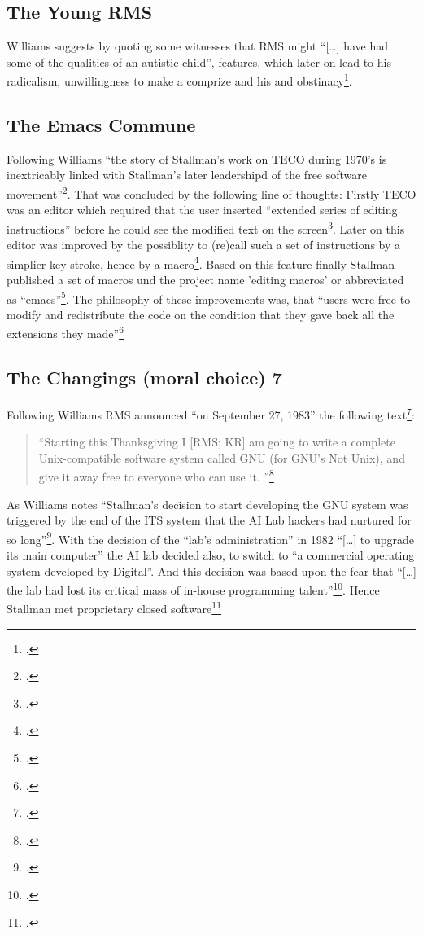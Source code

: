 \documentclass[DIV=calc,BCOR=5mm,11pt,headings=small,oneside,abstract=true, toc=bib]{scrartcl}
\begin{document}
\subsection{The Young RMS}

Williams suggests by quoting some witnesses that RMS might \enquote{[\ldots]
have had some of the qualities of an autistic child}, features, which
later on lead to his radicalism, unwillingness to make a comprize and his and
obstinacy\footcite[cf][31 et passim]{Williams2002a}.

\subsection{The Emacs Commune}

Following Williams \enquote{the story of Stallman's work on TECO during 1970's is
inextricably linked with Stallman's later leadershipd of the free software
movement}\footcite[cf][80]{Williams2002a}. That was concluded by the
following line of thoughts: Firstly TECO was an editor which required that the
user inserted \enquote{extended series of editing instructions} before he
could see the modified text on the screen\footcite[cf][81]{Williams2002a}. Later
on this editor was improved by the possiblity to (re)call such a set of
instructions by a simplier key stroke, hence by a
macro\footcite[cf][82]{Williams2002a}. Based on this feature finally Stallman
published a set of macros und the project name 'editing macros' or abbreviated
as \enquote{emacs}\footcite[cf][84f]{Williams2002a}. The philosophy of these
improvements was, that \enquote{users were free to modify and redistribute the
code on the condition that they gave back all the extensions they
made}\footcite[cf][85]{Williams2002a}

\subsection{The Changings (moral choice) 7}

Following Williams RMS announced \enquote{on September 27, 1983} the
following text\footcite[cf][85]{Williams2002a}:

\begin{quote}
\enquote{Starting this Thanksgiving I [RMS; KR] am going to write a complete
Unix-compatible software system called GNU (for GNU's Not Unix), and give it away free to
everyone who can use it.
}\footcite[][85]{Williams2002a}
\end{quote}

As Williams notes \enquote{Stallman's decision to start developing the GNU
system was triggered by the end of the ITS system that the AI Lab hackers
had nurtured for so long}\footcite[][91]{Williams2002a}. With the decision
of the \enquote{lab's administration} in 1982 \enquote{[\ldots] to
upgrade its main computer} the AI lab decided also, to switch to
\enquote{a commercial operating system developed by Digital}. And this
decision was based upon the fear that \enquote{[\ldots] the lab had lost
its critical mass of in-house programming
talent}\footcite[cf][92]{Williams2002a}. Hence Stallman met proprietary
closed software\footcite[cf][92]{Williams2002a}
\end{document}
